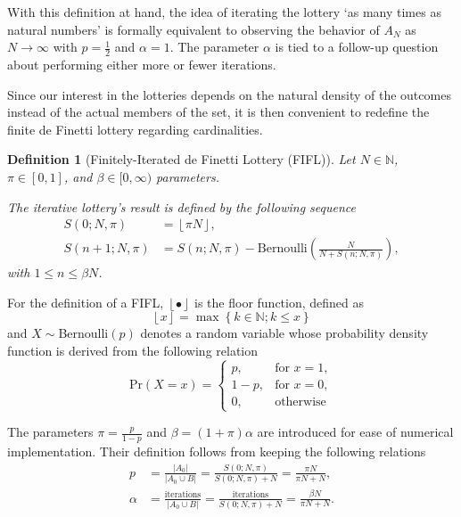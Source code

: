 \documentclass{article}
\newtheorem{definition}{Definition}
\newcommand{\N}{\mathbb{N}}
\newcommand{\card}[1]{\left| #1 \right|}
\newcommand{\sset}[1]{\left\{ #1 \right\}}
\newcommand{\ppar}[1]{\left( #1 \right)}
\newcommand{\floor}[1]{\left\lfloor #1 \right\rfloor}
\begin{document}
With this definition at hand, the idea of iterating the lottery `as many times as natural numbers' is formally equivalent to observing the behavior of $A_{N}$ as $N \rightarrow \infty$ with $p=\frac{1}{2}$ and $\alpha=1$.
%
The parameter $\alpha$ is tied to a follow-up question about performing either more or fewer iterations.


Since our interest in the lotteries depends on the natural density of the outcomes instead of the actual members of the set, it is then convenient to redefine the finite de Finetti lottery regarding cardinalities.

\begin{definition}[Finitely-Iterated de Finetti Lottery (FIFL)]
Let $N\in \N$, $\pi \in [0,1]$, and $\beta \in [0, \infty)$ parameters.

The iterative lottery's result is defined by the following sequence
\begin{align}
    S\ppar{0; N, \pi} &= \floor{\pi N}, \\
    S\ppar{n+1; N, \pi} &= S\ppar{n; N, \pi} - \text{Bernoulli}\ppar{\frac{N}{N+S\ppar{n; N, \pi}}},
\end{align}
with $1\leq n\leq \beta N$.
\end{definition}

For the definition of a FIFL, $\floor{\bullet}$ is the floor function, defined as
\begin{equation}
    \floor{x} = \max\sset{k\in \N; k \leq x}
\end{equation}
and $X\sim $Bernoulli$\ppar{p}$ denotes a random variable whose probability density function is derived from the following relation
\begin{equation}
    \text{Pr}\ppar{X=x} = \begin{cases}
        p, &\text{for } x=1,\\
        1-p, &\text{for } x=0, \\
        0, &\text{otherwise}
    \end{cases}
\end{equation}

The parameters $\pi = \frac{p}{1-p}$ and $\beta = \ppar{1+\pi} \alpha$ are introduced for ease of numerical implementation. 
%
Their definition follows from keeping the following relations
\begin{align}
    p &=
    \frac{\card{A_0}}{\card{A_0 \cup B}} = \frac{S\ppar{0; N, \pi}}{S\ppar{0; N, \pi}+N}
    = \frac{\pi N}{\pi N + N},
    \\
    \alpha &=
    \frac{\text{iterations}}{\card{A_0 \cup B}} =
    \frac{\text{iterations}}{S\ppar{0; N, \pi}+N}
    = \frac{\beta N}{\pi N + N}.
\end{align}
\end{document}
